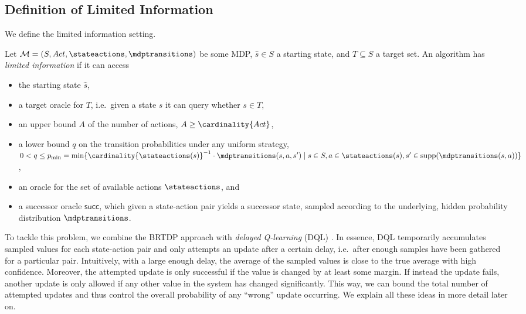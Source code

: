 \documentclass{article}
\newcommand{\MDP}{\mathcal{M}}
\newcommand{\States}{S}
\newcommand{\initialstate}{\hat{s}}
\newcommand{\Actions}{Act}
\DeclareMathOperator{\support}{supp}
\newcommand{\targetset}{T}
\newcommand{\successor}{\mathsf{succ}}
\begin{document}
\subsection{Definition of Limited Information}
We define the limited information setting.
\begin{definition} \label{def:limited_information}
	Let $\MDP = (\States, \Actions, \stateactions, \mdptransitions)$ be some MDP, $\initialstate \in \States$ a starting state, and $T \subseteq \States$ a target set.
	An algorithm has \emph{limited information} if it can access
	\begin{itemize}
		\item the starting state $\initialstate$,
		\item a target oracle for $\targetset$, i.e.\ given a state $s$ it can query whether $s \in T$,
		\item an upper bound $A$ of the number of actions, $A \geq \cardinality{\Actions}$,
		\item a lower bound $q$ on the transition probabilities under any uniform strategy, $0 < q \leq p_{\min} = \min\{ \cardinality{\stateactions(s)}^{-1} \cdot \mdptransitions(s, a, s') \mid s \in \States, a \in \stateactions(s), s' \in \support(\mdptransitions(s, a)) \}$,
		\item an oracle for the set of available actions $\stateactions$, and
		\item a successor oracle $\successor$, which given a state-action pair yields a successor state, sampled according to the underlying, hidden probability distribution $\mdptransitions$.
	\end{itemize}
\end{definition}

To tackle this problem, we combine the BRTDP approach with \emph{delayed Q-learning} (DQL) \cite{DBLP:conf/icml/StrehlLWLL06}.
In essence, DQL temporarily accumulates sampled values for each state-action pair and only attempts an update after a certain delay, i.e.\ after enough samples have been gathered for a particular pair.
Intuitively, with a large enough delay, the average of the sampled values is close to the true average with high confidence.
Moreover, the attempted update is only successful if the value is changed by at least some margin.
If instead the update fails, another update is only allowed if any other value in the system has changed significantly.
This way, we can bound the total number of attempted updates and thus control the overall probability of any \enquote{wrong} update occurring.
We explain all these ideas in more detail later on.
\end{document}
